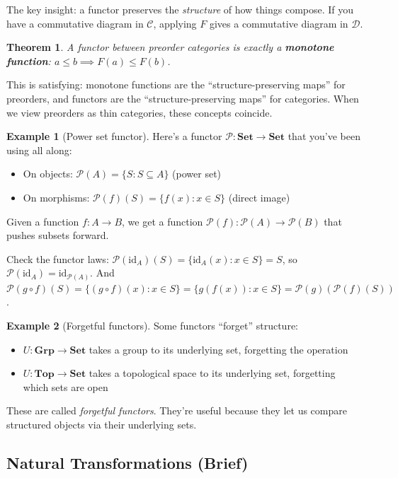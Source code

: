 \documentclass[11pt]{article}
\newcommand{\Pow}{\mathcal{P}}
\newcommand{\cat}[1]{\mathbf{#1}}
\newcommand{\Set}{\cat{Set}}
\newcommand{\id}{\mathrm{id}}
\theoremstyle{definition}
\newtheorem{example}{Example}[section]
\theoremstyle{plain}
\newtheorem{theorem}{Theorem}[section]
\theoremstyle{remark}
\begin{document}
The key insight: a functor preserves the \emph{structure} of how things compose. If you have a commutative diagram in $\mathcal{C}$, applying $F$ gives a commutative diagram in $\mathcal{D}$.

\begin{theorem}
A functor between preorder categories is exactly a \textbf{monotone function}: $a \leq b \implies F(a) \leq F(b)$.
\end{theorem}

This is satisfying: monotone functions are the ``structure-preserving maps'' for preorders, and functors are the ``structure-preserving maps'' for categories. When we view preorders as thin categories, these concepts coincide.

\begin{example}[Power set functor]
Here's a functor $\Pow: \Set \to \Set$ that you've been using all along:
\begin{itemize}
  \item On objects: $\Pow(A) = \{S : S \subseteq A\}$ (power set)
  \item On morphisms: $\Pow(f)(S) = \{f(x) : x \in S\}$ (direct image)
\end{itemize}
Given a function $f: A \to B$, we get a function $\Pow(f): \Pow(A) \to \Pow(B)$ that pushes subsets forward.

Check the functor laws: $\Pow(\id_A)(S) = \{\id_A(x) : x \in S\} = S$, so $\Pow(\id_A) = \id_{\Pow(A)}$. And $\Pow(g \circ f)(S) = \{(g \circ f)(x) : x \in S\} = \{g(f(x)) : x \in S\} = \Pow(g)(\Pow(f)(S))$.
\end{example}

\begin{example}[Forgetful functors]
Some functors ``forget'' structure:
\begin{itemize}
  \item $U: \cat{Grp} \to \Set$ takes a group to its underlying set, forgetting the operation
  \item $U: \cat{Top} \to \Set$ takes a topological space to its underlying set, forgetting which sets are open
\end{itemize}
These are called \emph{forgetful functors}. They're useful because they let us compare structured objects via their underlying sets.
\end{example}

\subsection{Natural Transformations (Brief)}
\end{document}
